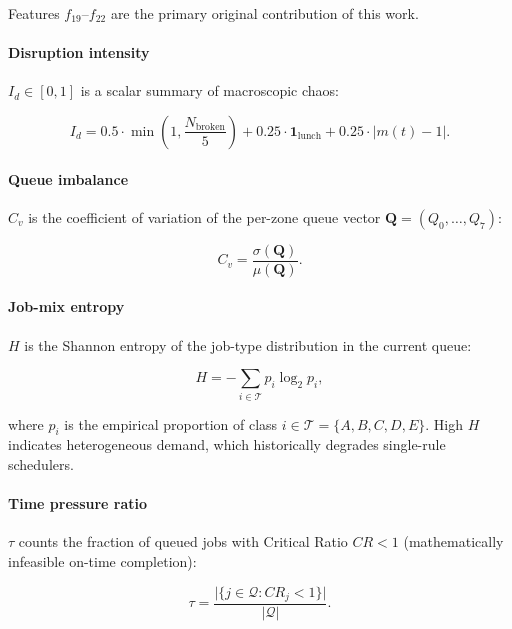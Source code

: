 \documentclass[3p,times]{elsarticle}
\begin{document}
Features $f_{19}$--$f_{22}$ are the primary original contribution
of this work.

\paragraph{Disruption intensity} $I_d \in [0,1]$ is a scalar
summary of macroscopic chaos:

\begin{equation}
  I_d = 0.5\cdot\min\!\left(1,\frac{N_{\mathrm{broken}}}{5}\right)
       + 0.25\cdot\mathbf{1}_{\mathrm{lunch}}
       + 0.25\cdot\lvert m(t) - 1\rvert.
  \label{eq:id}
\end{equation}

\paragraph{Queue imbalance} $C_v$ is the coefficient of variation
of the per-zone queue vector $\bm{Q}=(Q_0,\ldots,Q_7)$:

\begin{equation}
  C_v = \frac{\sigma(\bm{Q})}{\mu(\bm{Q})}.
  \label{eq:cv}
\end{equation}

\paragraph{Job-mix entropy} $H$ is the Shannon entropy of the
job-type distribution in the current queue:

\begin{equation}
  H = -\sum_{i\in\mathcal{T}} p_i \log_2 p_i,
  \label{eq:entropy}
\end{equation}

\noindent where $p_i$ is the empirical proportion of class
$i\in\mathcal{T}=\{A,B,C,D,E\}$.  High $H$ indicates
heterogeneous demand, which historically degrades single-rule
schedulers.

\paragraph{Time pressure ratio} $\tau$ counts the fraction of
queued jobs with Critical Ratio $CR < 1$ (mathematically
infeasible on-time completion):

\begin{equation}
  \tau = \frac{\bigl|\{j\in\mathcal{Q}:CR_j < 1\}\bigr|}{|\mathcal{Q}|}.
  \label{eq:tau}
\end{equation}
\end{document}
